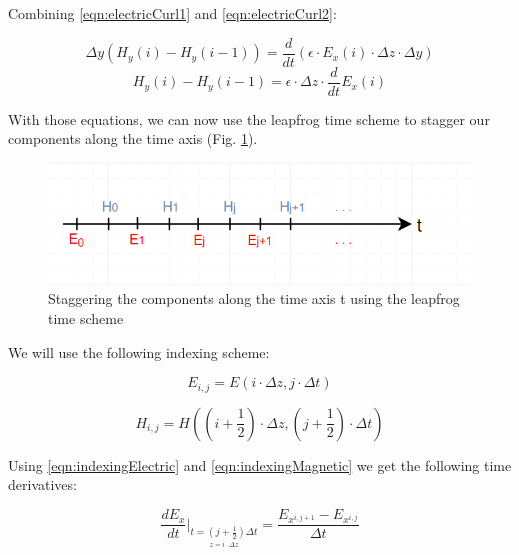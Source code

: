 Combining \ref{eqn:electricCurl1} and \ref{eqn:electricCurl2}:

\begin{equation}
	\label{eqn:electricCurl3}
	\Delta y (H_y(i) - H_y(i-1)) = \frac{d}{dt} (\epsilon \cdot E_x(i) \cdot \Delta z \cdot \Delta y)
\end{equation}
\begin{equation}
	\label{eqn:electricCurl4}
	H_y(i) - H_y(i-1) = \epsilon  \cdot \Delta z  \cdot \frac{d}{dt} E_x(i)
\end{equation}

With those equations, we can now use the leapfrog time scheme to stagger our components along the time axis (Fig. \ref{fig:fdtd1dLeapfrog}).

\begin{figure}[!h]
	\centering
	\includegraphics[scale=0.75]{Figures/fdtd1dLeapfrog}
	\decoRule
	\caption[Leapfrog Time Scheme]{Staggering the components along the time axis t using the leapfrog time scheme}
	\label{fig:fdtd1dLeapfrog}
\end{figure}

We will use the following indexing scheme:

\begin{equation}
	\label{eqn:indexingElectric}
	E_{i,j} = E(i \cdot \Delta z , j \cdot \Delta t)
\end{equation}

\begin{equation}
	\label{eqn:indexingMagnetic}
	H_{i,j} = H((i + \frac{1}{2}) \cdot \Delta z , (j + \frac{1}{2}) \cdot \Delta t)
\end{equation}

Using \ref{eqn:indexingElectric} and \ref{eqn:indexingMagnetic} we get the following time derivatives:

\begin{equation}
	\label{eqn:timeDerivativeE}
	\frac{d E_x}{dt} \bigg\rvert_{\underset{z = i \cdot \Delta z}{t=(j + \frac{1}{2})\Delta t}} = \frac{E_{x^{i,j+1}} - E_{x^{i,j}}}{\Delta t}
\end{equation}

